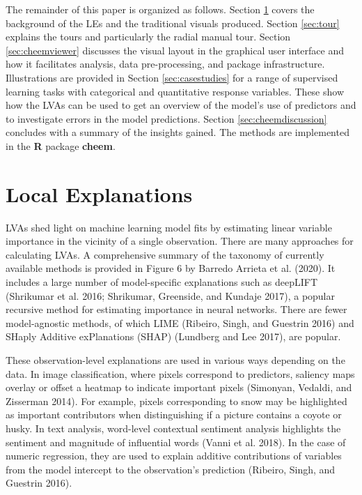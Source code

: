 \documentclass[
]{article}
\begin{document}
The remainder of this paper is organized as follows. Section \ref{sec:explanations} covers the background of the LEs and the traditional visuals produced. Section \ref{sec:tour} explains the tours and particularly the radial manual tour. Section \ref{sec:cheemviewer} discusses the visual layout in the graphical user interface and how it facilitates analysis, data pre-processing, and package infrastructure. Illustrations are provided in Section \ref{sec:casestudies} for a range of supervised learning tasks with categorical and quantitative response variables. These show how the LVAs can be used to get an overview of the model's use of predictors and to investigate errors in the model predictions. Section \ref{sec:cheemdiscussion} concludes with a summary of the insights gained. The methods are implemented in the \textbf{R} package \textbf{cheem}.

\hypertarget{sec:explanations}{%
\section{Local Explanations}\label{sec:explanations}}

LVAs shed light on machine learning model fits by estimating linear variable importance in the vicinity of a single observation. There are many approaches for calculating LVAs.
A comprehensive summary of the taxonomy of currently available methods is provided in Figure 6 by Barredo Arrieta et al. (2020). It includes a large number of model-specific explanations such as deepLIFT (Shrikumar et al. 2016; Shrikumar, Greenside, and Kundaje 2017), a popular recursive method for estimating importance in neural networks. There are fewer model-agnostic methods, of which LIME (Ribeiro, Singh, and Guestrin 2016) and SHaply Additive exPlanations (SHAP) (Lundberg and Lee 2017), are popular.

These observation-level explanations are used in various ways depending on the data. In image classification, where pixels correspond to predictors, saliency maps overlay or offset a heatmap to indicate important pixels (Simonyan, Vedaldi, and Zisserman 2014). For example, pixels corresponding to snow may be highlighted as important contributors when distinguishing if a picture contains a coyote or husky. In text analysis, word-level contextual sentiment analysis highlights the sentiment and magnitude of influential words (Vanni et al. 2018). In the case of numeric regression, they are used to explain additive contributions of variables from the model intercept to the observation's prediction (Ribeiro, Singh, and Guestrin 2016).
\end{document}

